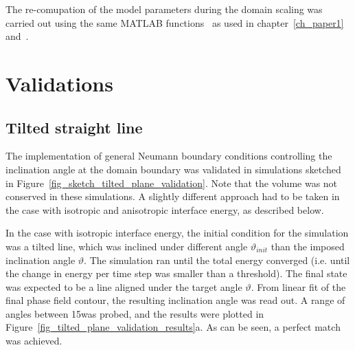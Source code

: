The re-comupation of the model parameters during the domain scaling was carried out using the same MATLAB functions~\cite{Minar2022dataset} as used in chapter~\ref{ch_paper1} and~\cite{Minar2022}.


\section{Validations}
	\subsection{Tilted straight line}
	The implementation of general Neumann boundary conditions controlling the inclination angle at the domain boundary was validated in simulations sketched in Figure~\ref{fig_sketch_tilted_plane_validation}. Note that the volume was not conserved in these simulations. A slightly different approach had to be taken in the case with isotropic and anisotropic interface energy, as described below.
	
	In the case with isotropic interface energy, the initial condition for the simulation was a tilted line, which was inclined under different angle $\vartheta_{init}$ than the imposed inclination angle $\vartheta$. The simulation ran until the total energy converged (i.e. until the change in energy per time step was smaller than a threshold). The final state was expected to be a line aligned under the target angle $\vartheta$. From linear fit of the final phase field contour, the resulting inclination angle was read out. A range of angles between 15\textdegree was probed, and the results were plotted in Figure~\ref{fig_tilted_plane_validation_results}a. As can be seen, a perfect match was achieved.
	
